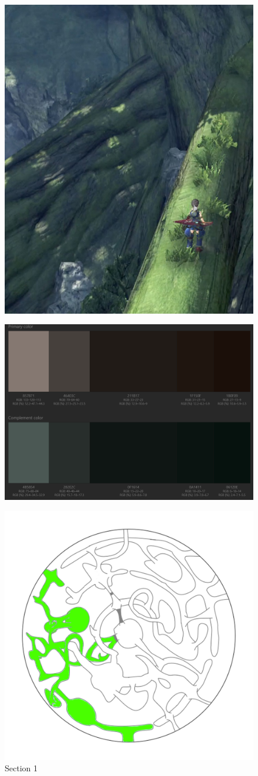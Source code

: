 \begin{figure}[H]
	\centering
	\includegraphics[width=0.5\linewidth]{images/visual_ref/15_giant_chasm/tree.jpg}
\end{figure}

\begin{figure}[H]
	\centering
	\includegraphics[width=0.8\linewidth]{images/visual_ref/15_giant_chasm/pallette/pallette_section_01.png}
\end{figure}

\begin{figure}[H]
	\centering
	\includegraphics[width=0.7\linewidth]{images/map/2D_map_section_01.png}
	\caption*{Section 1}
\end{figure}

